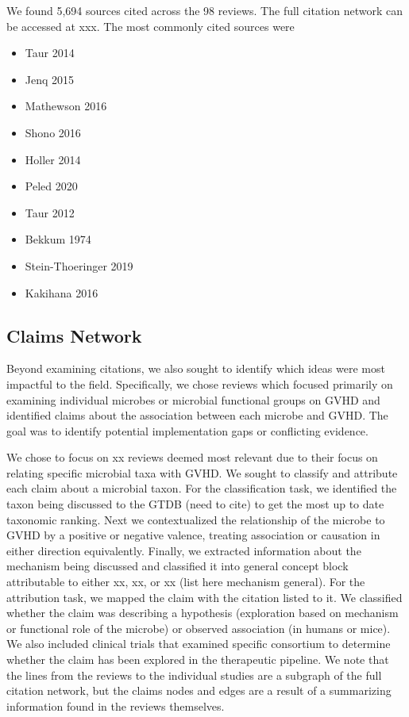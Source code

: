 \documentclass[11pt,a4paper]{article}
\begin{document}
We found 5,694 sources cited across the 98 reviews. The full citation network can be accessed at xxx. The most commonly cited sources were 
\begin{itemize}
    \item Taur 2014
    \item Jenq 2015 
    \item Mathewson 2016
    \item Shono 2016 
    \item Holler 2014
    \item Peled 2020
    \item Taur 2012
    \item Bekkum 1974
    \item Stein-Thoeringer 2019
    \item Kakihana 2016   
\end{itemize}

\subsection{Claims Network}
Beyond examining citations, we also sought to identify which ideas were most impactful to the field. Specifically, we chose reviews which focused primarily on examining individual microbes or microbial functional groups on GVHD and identified claims about the association between each microbe and GVHD. The goal was to identify potential implementation gaps or conflicting evidence. 

We chose to focus on xx reviews deemed most relevant due to their focus on relating specific microbial taxa with GVHD. We sought to classify and attribute each claim about a microbial taxon. For the classification task, we identified the taxon being discussed to the GTDB (need to cite) to get the most up to date taxonomic ranking. Next we contextualized the relationship of the microbe to GVHD by a positive or negative valence, treating association or causation in either direction equivalently. Finally, we extracted information about the mechanism being discussed and classified it into general concept block attributable to either xx, xx, or xx (list here mechanism general). For the attribution task, we mapped the claim with the citation listed to it. We classified whether the claim was describing a hypothesis (exploration based on mechanism or functional role of the microbe) or observed association (in humans or mice). We also included clinical trials that examined specific consortium to determine whether the claim has been explored in the therapeutic pipeline. We note that the lines from the reviews to the individual studies are a subgraph of the full citation network, but the claims nodes and edges are a result of a summarizing information found in the reviews themselves. 
\end{document}
